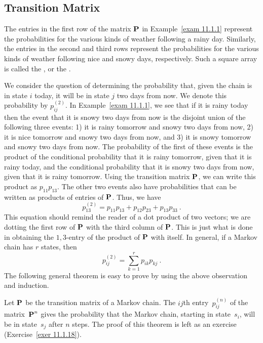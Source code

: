 \subsection*{Transition Matrix}
The entries in the first row of the matrix ${\mbox{\bf P}\/}$ in Example~\ref{exam
11.1.1}
represent  the probabilities for the various kinds of weather following a rainy
day.
Similarly, the entries in the second and third rows represent the probabilities
for
the various kinds of weather following nice and snowy days, respectively.
Such a square array is called the , or the  .
\par
We consider the question of determining the probability that, given the chain
is in
state $i$ today, it will be in state $j$ two days from now.  We denote this
probability by $p_{ij}^{(2)}$.  In Example~\ref{exam 11.1.1}, we see that if it
is
rainy today then the event that it is snowy two days from now is the disjoint
union
of the following three events: 1) it is rainy tomorrow and snowy two days from
now,
2) it is nice tomorrow and snowy two days from now, and 3) it is snowy tomorrow
and
snowy two days from now.  The probability of the first of these events is the
product
of the conditional probability that it is rainy tomorrow, given that it is
rainy today,
and the conditional probability that it is snowy two days from now, given that
it is
rainy tomorrow.  Using the transition matrix ${\mbox{\bf P}\/}$, we can write this
product as
$p_{11}p_{13}$.  The other two events also have probabilities that can be
written as products
of entries of ${\mbox{\bf P}\/}$.  Thus, we have
$$p_{13}^{(2)} = p_{11}p_{13} + p_{12}p_{23} + p_{13}p_{33}\ .$$
This equation should remind the reader of a dot product of two vectors; we are
dotting the first
row of $ {\mbox{\bf P}\/}$ with the third column of $ {\mbox{\bf P}\/}$.  This is just what is
done in
obtaining the $1,3$-entry of the product of $ {\mbox{\bf P}\/}$ with itself.  
In general, if a Markov chain has $r$ states, then
$$p_{ij}^{(2)} = \sum_{k = 1}^r p_{ik}p_{kj}\ .$$
The following general theorem is easy to prove by using the above observation
and
induction.
\begin{theorem}\label{thm 11.1.1}
Let $ {\mbox{\bf P}\/}$ be the transition matrix of a Markov chain.  The $ij$th
entry~$p_{ij}^{(n)}$ of the matrix~$ {\mbox{\bf P}\/}^n$ gives the
probability that the Markov chain, starting in state~$s_i$, will be in
state~$s_j$ after $n$ steps.
\proof
The proof of this theorem is left as an exercise (Exercise~\ref{exer 11.1.18}).
\end{theorem}

